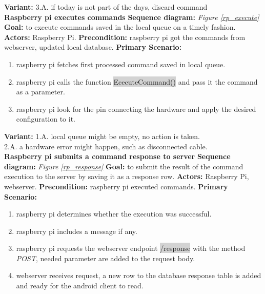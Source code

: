 \documentclass[12pt, oneside, a4paper]{book}
\newcommand{\code}[1]{{\color{red}\colorbox{lightgray}{#1}}}
\newcommand\boldcolor[1]{\textcolor{bold}{\textbf{#1}}}
\begin{document}
				\textbf{Variant:}\newline
				\hspace*{5mm}3.A. if today is not part of the days, discard command \\
				\newline\boldcolor{Raspberry pi executes commands}
				\newline\textbf{Sequence diagram:} \textit{Figure \ref{rp_execute}}
				\newline\textbf{Goal:} to execute commands saved in the local queue on a timely fashion.
				\newline\textbf{Actors:} Raspberry Pi.	
				\newline\textbf{Precondition:} raspberry pi got the commands from webserver, updated local database.
				\newline\textbf{Primary Scenario:}	
				\begin{enumerate}[label*=\arabic*.]
					\item raspberry pi fetches first processed command saved in local queue.
					\item raspberry pi calls the function \code{EcecuteCommand()} and pass it the command as a parameter.
					\item raspberry pi look for the pin connecting the hardware and apply the desired configuration to it.
				\end{enumerate}
				\textbf{Variant:}\newline	
				\hspace*{5mm}1.A. local queue might be empty, no action is taken. \\
				\hspace*{5mm}2.A. a hardware error might happen, such as disconnected cable. \\
				\newline\boldcolor{Raspberry pi submits a command response to server}
				\newline\textbf{Sequence diagram:} \textit{Figure \ref{rp_response}}
				\newline\textbf{Goal:} to submit the result of the command execution to the server by saving it as a response row.
				\newline\textbf{Actors:} Raspberry Pi, webserver.
				\newline\textbf{Precondition:} raspberry pi executed commands.
				\newline\textbf{Primary Scenario:}	
				\begin{enumerate}[label*=\arabic*.]
					\item raspberry pi determines whether the execution was successful. 
					\item raspberry pi includes a message if any.
					\item  raspberry pi requests the webserver endpoint \code{/response} with the method \textit{POST}, needed parameter are added to the request body.
					\item webserver receives request, a new row to the database response table is added and ready for the android client to read. 
				\end{enumerate}
\end{document}
